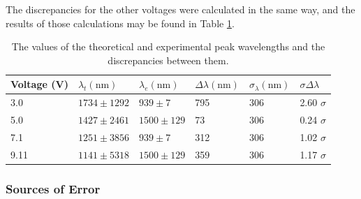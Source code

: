 \documentclass[a4paper]{article}
\begin{document}
\qq The discrepancies for the other voltages were calculated in the same way,
and the results of those calculations may be found in Table
\ref{tab:peakWavelengths}.

\begin{table}[H]
  \caption{The values of the theoretical and experimental peak wavelengths and
    the discrepancies between them.}
  \label{tab:peakWavelengths}
  \begin{center}
    \begin{tabular}{|l|l|l|l|l|l|}
      \hline
      Voltage (\si{\volt}) & \( \lambda_t (\si{\nano\meter}) \) & 
      \( \lambda_e (\si{\nano\meter}) \) & 
      \( \Delta \lambda (\si{\nano\meter}) \) & 
      \( \sigma_{\lambda} (\si{\nano\meter}) \) &
      \( \sigma \Delta \lambda \) \\
      \hline
      3.0 & \( 1734 \pm 1292 \) & \( 939 \pm 7 \) & 795 & 306 & 2.60 \( \sigma
                                                                \) \\
      5.0 & \( 1427 \pm 2461 \) & \( 1500 \pm 129 \) & 73 & 306 & 0.24 \( \sigma
                                                                  \) \\
      7.1 & \( 1251 \pm 3856 \) & \( 939 \pm 7 \) & 312 & 306 & 1.02 \( \sigma
                                                                \) \\
      9.11 & \( 1141 \pm 5318 \) & \( 1500 \pm 129 \) & 359 & 306 & 1.17 \(
                                                                    \sigma \) \\
      \hline
    \end{tabular}
  \end{center}
\end{table}

\subsubsection{Sources of Error}
\end{document}
